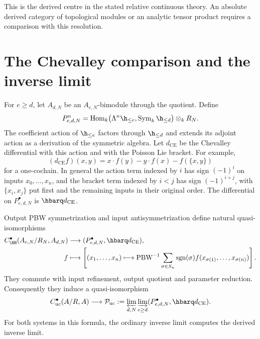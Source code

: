 This is the derived centre in the stated relative continuous theory.
An absolute derived category of topological modules or an analytic
tensor product requires a comparison with this resolution.

\section{The Chevalley comparison and the inverse limit}

For $e\geq d$, let $A_{d,N}$ be an $A_{e,N}$-bimodule through the
quotient. Define
\begin{equation}\label{eq:vol2-rectangular-chevalley}
 P^n_{e,d,N}
  =\operatorname{Hom}_k\bigl(\Lambda^n\h_{\leq e},
                  \operatorname{Sym}_k\h_{\leq d}\bigr)\otimes_kR_N.
\end{equation}
The coefficient action of $\h_{\leq e}$ factors through
$\h_{\leq d}$ and extends its adjoint action as a derivation of
the symmetric algebra. Let $d_{\mathrm{CE}}$ be the Chevalley
differential with this action and with the Poisson Lie bracket.
For example,
\[
 (d_{\mathrm{CE}}f)(x,y)=x\cdot f(y)-y\cdot f(x)-f(\{x,y\})
\]
for a one-cochain. In general the action term indexed by $i$ has
sign $(-1)^i$ on inputs $x_0,\ldots,x_n$, and the bracket term
indexed by $i<j$ has sign $(-1)^{i+j}$, with $\{x_i,x_j\}$ put
first and the remaining inputs in their original order.
The differential on $P^\bullet_{e,d,N}$ is
$\hbarq d_{\mathrm{CE}}$.

\begin{theorem}
\label{thm:vol2-continuous-chevalley}
Output PBW symmetrization and input antisymmetrization define
natural quasi-isomorphisms
\begin{align}
 C^\bullet_{\HH}(A_{e,N}/R_N,A_{d,N})
   &\longrightarrow (P^\bullet_{e,d,N},\hbarq d_{\mathrm{CE}}),
       \label{eq:vol2-rectangular-map}\\
 f&\longmapsto\left[(x_1,\ldots,x_n)\longmapsto
     \operatorname{PBW}^{-1}\sum_{\sigma\in S_n}
       \operatorname{sgn}(\sigma)
       f(x_{\sigma(1)},\ldots,x_{\sigma(n)})\right].\notag
\end{align}
They commute with input refinement, output quotient and parameter
reduction. Consequently they induce a quasi-isomorphism
\begin{equation}\label{eq:vol2-continuous-chevalley-map}
 C^\bullet_{\mathrm{uc}}(A/R,A)
   \longrightarrow
 \mathcal P_{\mathrm{uc}}
   :=\varprojlim_{d,N}\varinjlim_{e\geq d}
                   (P^\bullet_{e,d,N},\hbarq d_{\mathrm{CE}}).
\end{equation}
For both systems in this formula, the ordinary inverse limit
computes the derived inverse limit.
\end{theorem}

